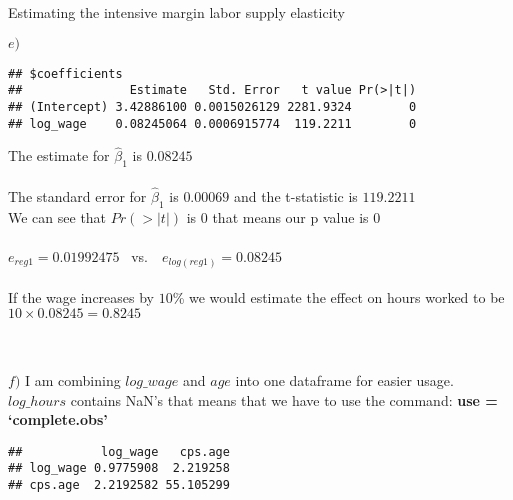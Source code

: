 \documentclass[
  ignorenonframetext,
]{beamer}
\newenvironment{Shaded}{\begin{snugshade}}{\end{snugshade}}
\newcommand{\DataTypeTok}[1]{\textcolor[rgb]{0.13,0.29,0.53}{#1}}
\newcommand{\FloatTok}[1]{\textcolor[rgb]{0.00,0.00,0.81}{#1}}
\newcommand{\KeywordTok}[1]{\textcolor[rgb]{0.13,0.29,0.53}{\textbf{#1}}}
\newcommand{\NormalTok}[1]{#1}
\newcommand{\OperatorTok}[1]{\textcolor[rgb]{0.81,0.36,0.00}{\textbf{#1}}}
\newcommand{\OtherTok}[1]{\textcolor[rgb]{0.56,0.35,0.01}{#1}}
\newcommand{\StringTok}[1]{\textcolor[rgb]{0.31,0.60,0.02}{#1}}
\begin{document}
\begin{frame}[fragile]{Estimating the intensive margin labor supply
elasticity}
\begin{block}{\(e)\)}
\begin{verbatim}
## $coefficients
##               Estimate   Std. Error   t value Pr(>|t|)
## (Intercept) 3.42886100 0.0015026129 2281.9324        0
## log_wage    0.08245064 0.0006915774  119.2211        0
\end{verbatim}

The estimate for \(\hat{\beta}_1\) is \(0.08245\)\\
~\\
The standard error for \(\hat{\beta}_1\) is \(0.00069\) and the
t-statistic is \(119.2211\)\\
We can see that \(Pr(>|t|)\) is \(0\) that means our p value is 0\\
~\\
\(e_{reg1} = 0.01992475\) ~vs.~~\(e_{log(reg1)} = 0.08245\)\\
~\\
If the wage increases by \(10\)\% we would estimate the effect on hours
worked to be \(10 \times 0.08245 = 0.8245\)\\
~\\
~\\
\end{block}

\begin{block}{\(f)\)}
\protect\hypertarget{f}{}
\hfill\break
I am combining \(log\_wage\) and \(age\) into one dataframe for easier
usage.\\
\(log\_hours\) contains NaN's that means that we have to use the
command: \textbf{use = `complete.obs'}

\begin{Shaded}
\end{Shaded}

\begin{verbatim}
##           log_wage   cps.age
## log_wage 0.9775908  2.219258
## cps.age  2.2192582 55.105299
\end{verbatim}

\begin{Shaded}
\end{Shaded}


\end{block}
\end{frame}
\end{document}
